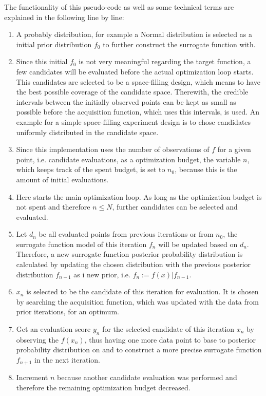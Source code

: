 The functionality of this pseudo-code as well as some technical terms are explained in the following line by line:
\begin{enumerate}
    \item A probably distribution, for example a Normal distribution is selected as a initial prior distribution $f_0$ to further construct the surrogate function with.
    \item Since this initial $f_0$ is not very meaningful regarding the target function, a few candidates will be evaluated before the actual optimization loop starts.
    This candidates are selected to be a space-filling design, which means to have the best possible coverage of the candidate space.
    Therewith, the credible intervals between the initially observed points can be kept as small as possible before the acquisition function, which uses this intervals, is used.
    An example for a simple space-filling experiment design is to chose candidates uniformly distributed in the candidate space.
    \item Since this implementation uses the number of observations of $f$ for a given point, i.e. candidate evaluations, as a optimization budget, the variable $n$, which keeps track of the spent budget, is set to $n_0$, because this is the amount of initial evaluations.
    \item Here starts the main optimization loop.
    As long as the optimization budget is not spent and therefore $n \leq N$, further candidates can be selected and evaluated.
    \item Let $d_n$ be all evaluated points from previous iterations or from $n_0$, the surrogate function model of this iteration $f_n$ will be updated based on $d_n$.
    Therefore, a new surrogate function posterior probability distribution is calculated by updating the chosen distribution with the previous posterior distribution $f_{n-1}$ as i new prior, i.e. $f_n := f(x)|f_{n-1}$.
    \item $x_n$ is selected to be the candidate of this iteration for evaluation. It is chosen by searching the acquisition function, which was updated with the data from prior iterations, for an optimum.
    \item Get an evaluation score $y_n$ for the selected candidate of this iteration $x_n$ by observing the $f(x_n)$, thus having one more data point to base to posterior probability distribution on and to construct a more precise surrogate function $f_{n+1}$ in the next iteration.
    \item Increment $n$ because another candidate evaluation was performed and therefore the remaining optimization budget decreased.

\end{enumerate}
